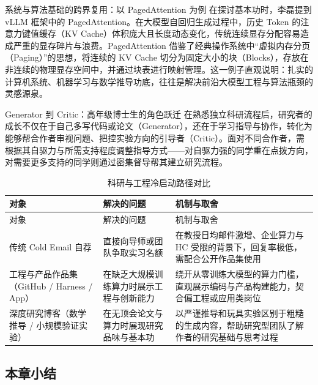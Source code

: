 \documentclass[UTF8,a4paper,11pt,fontset=fandol]{ctexart}
\begin{document}
\begin{knowledgebox}{系统与算法基础的跨界复用：以 PagedAttention 为例}
在探讨基本功时，李磊提到 vLLM 框架中的 PagedAttention。在大模型自回归生成过程中，历史 Token 的注意力键值缓存（KV Cache）体积庞大且长度动态变化，传统连续显存分配容易造成严重的显存碎片与浪费。PagedAttention 借鉴了经典操作系统中“虚拟内存分页（Paging）”的思想，将连续的 KV Cache 切分为固定大小的块（Blocks），存放在非连续的物理显存空间中，并通过块表进行映射管理。这一例子直观说明：扎实的计算机系统、机器学习与数学推导功底，往往是解决前沿大模型工程与算法瓶颈的灵感源泉。
\end{knowledgebox}
\begin{importantbox}{Generator 到 Critic：高年级博士生的角色跃迁}
在熟悉独立科研流程后，研究者的成长不仅在于自己多写代码或论文（Generator），还在于学习指导与协作，转化为能够帮合作者审视问题、把控实验方向的引导者（Critic）。面对不同合作者，需根据其自驱力与所需支持程度调整指导方式——对自驱力强的同学重在点拨方向，对需要更多支持的同学则通过密集督导帮其建立研究流程。
\end{importantbox}
\begingroup\small\setlength{\LTcapwidth}{\linewidth}
\begin{longtable}{>{\raggedright\arraybackslash}p{\dimexpr(\linewidth-6\tabcolsep)/3\relax}>{\raggedright\arraybackslash}p{\dimexpr(\linewidth-6\tabcolsep)/3\relax}>{\raggedright\arraybackslash}p{\dimexpr(\linewidth-6\tabcolsep)/3\relax}}
\caption{科研与工程冷启动路径对比}\\
\toprule
对象 & 解决的问题 & 机制与取舍\\\midrule
\endfirsthead
\toprule
对象 & 解决的问题 & 机制与取舍\\\midrule
\endhead
传统 Cold Email 自荐 & 直接向导师或团队争取实习名额 & 在教授日均邮件激增、企业算力与 HC 受限的背景下，回复率极低，需配合公开作品集使用\\[4pt]
工程与产品作品集（GitHub / Harness / App） & 在缺乏大规模训练算力时展示工程与创新能力 & 绕开从零训练大模型的算力门槛，直观展示编码与产品构建能力，契合偏工程或应用类岗位\\[4pt]
深度研究博客（数学推导 / 小规模验证实验） & 在无顶会论文与算力时展现研究品味与基本功 & 以严谨推导和玩具实验区别于粗糙的生成内容，帮助研究型团队了解作者的研究基础与思考过程\\[4pt]
\bottomrule\end{longtable}\endgroup
{}\subsection{本章小结}
\end{document}
